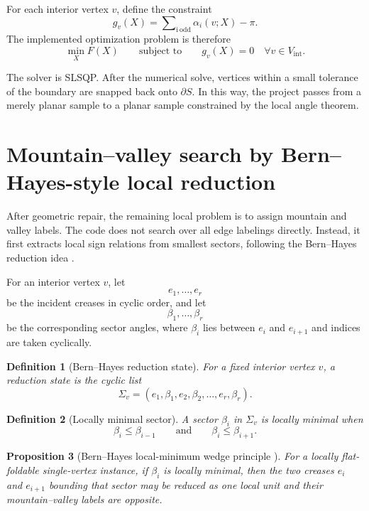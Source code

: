 \documentclass[11pt]{article}
\newtheorem{definition}{Definition}[section]
\newtheorem{proposition}[definition]{Proposition}
\theoremstyle{remark}
\newcommand{\odd}{\operatorname*{\sum\nolimits_{i\ \mathrm{odd}}}}
\begin{document}
For each interior vertex $v$, define the constraint
\[
g_v(X)=\odd \alpha_i(v;X)-\pi.
\]
The implemented optimization problem is therefore
\begin{equation}\label{eq:opt}
\min_X F(X)
\qquad
\text{subject to}
\qquad
g_v(X)=0
\quad
\forall v\in V_{\mathrm{int}}.
\end{equation}

The solver is SLSQP. After the numerical solve, vertices within a small
tolerance of the boundary are snapped back onto $\partial S$. In this way, the
project passes from a merely planar sample to a planar sample constrained by
the local angle theorem.

\section{Mountain--valley search by Bern--Hayes-style local reduction}

After geometric repair, the remaining local problem is to assign mountain and
valley labels. The code does not search over all edge labelings directly.
Instead, it first extracts local sign relations from smallest sectors, following
the Bern--Hayes reduction idea {\cite{bern_hayes}}.

For an interior vertex $v$, let
\[
e_1,\dots,e_r
\]
be the incident creases in cyclic order, and let
\[
\beta_1,\dots,\beta_r
\]
be the corresponding sector angles, where $\beta_i$ lies between $e_i$ and
$e_{i+1}$ and indices are taken cyclically.

\begin{definition}[Bern--Hayes reduction state]
For a fixed interior vertex $v$, a \emph{reduction state} is the cyclic list
\[
\Sigma_v=(e_1,\beta_1,e_2,\beta_2,\dots,e_r,\beta_r).
\]
\end{definition}

\begin{definition}[Locally minimal sector]
A sector $\beta_i$ in $\Sigma_v$ is \emph{locally minimal} when
\[
\beta_i\le \beta_{i-1}
\qquad\text{and}\qquad
\beta_i\le \beta_{i+1}.
\]
\end{definition}

\begin{proposition}[Bern--Hayes local-minimum wedge principle {\cite{bern_hayes}}]
For a locally flat-foldable single-vertex instance, if $\beta_i$ is locally
minimal, then the two creases $e_i$ and $e_{i+1}$ bounding that sector may be
reduced as one local unit and their mountain--valley labels are opposite.
\end{proposition}
\end{document}
